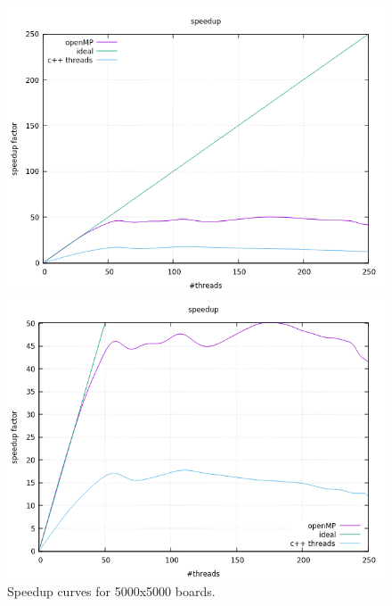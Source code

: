 \documentclass[a4paper,10pt]{article}
\begin{document}
		\begin{figure}[H]
		\centering
		\begin{minipage}[t]{0.55\linewidth}
			\includegraphics[width=\linewidth]{BenchMarkGOL/speedup/5000/graph5000.png}
		\end{minipage}%
		\begin{minipage}[t]{0.55\linewidth}
			\includegraphics[width=\linewidth]{BenchMarkGOL/speedup/5000/graph5000_zoom.png}
		\end{minipage}
		\caption{Speedup curves for 5000x5000 boards.}
		\label{5000}
	\end{figure}
\end{document}
